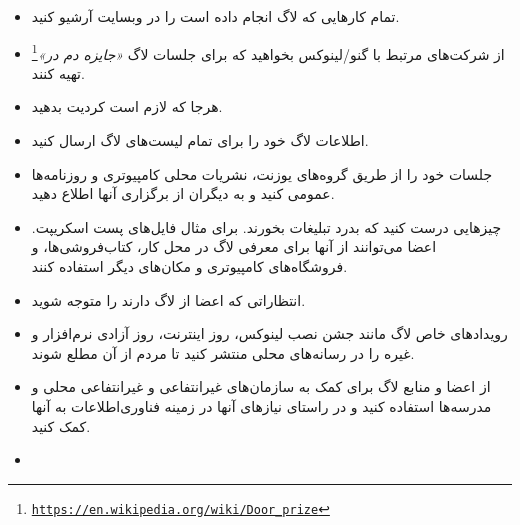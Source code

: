 \begin{itemize}
\item
تمام کارهایی که لاگ انجام داده است را در وبسایت آرشیو کنید.
\item
از شرکت‌های مرتبط با گنو/لینوکس بخواهید که برای جلسات لاگ
\emph{«جایزه دم در»}\footnote{\texttt{\url{https://en.wikipedia.org/wiki/Door_prize}}}
تهیه کنند.
\item
هرجا که لازم است کردیت بدهید.
\item
اطلاعات لاگ خود را برای تمام لیست‌های لاگ ارسال کنید.
\item
جلسات‌ خود را از طریق گروه‌های یوزنت، نشریات محلی کامپیوتری و روزنامه‌ها
عمومی کنید و به دیگران از برگزاری آنها اطلاع دهید.
\item
چیزهایی درست کنید که بدرد تبلیغات بخورند. برای مثال فایل‌های پست اسکریپت.
اعضا می‌توانند از آنها برای معرفی لاگ در محل کار، کتاب‌فروشی‌ها، و فروشگاه‌های کامپیوتری
و مکان‌های دیگر استفاده کنند.
\item
انتظاراتی که اعضا از لاگ دارند را متوجه شوید.
\item
رویدادهای خاص لاگ مانند جشن نصب لینوکس، روز اینترنت، روز آزادی نرم‌افزار
و غیره را در رسانه‌های محلی منتشر کنید تا مردم از آن مطلع شوند.
\item
از اعضا و منابع لاگ برای کمک به سازمان‌های غیرانتفاعی و غیرانتفاعی محلی
و مدرسه‌ها استفاده کنید و در راستای نیازهای آنها در زمینه فناوری‌اطلاعات
به آنها کمک کنید.
\item

\end{itemize}
